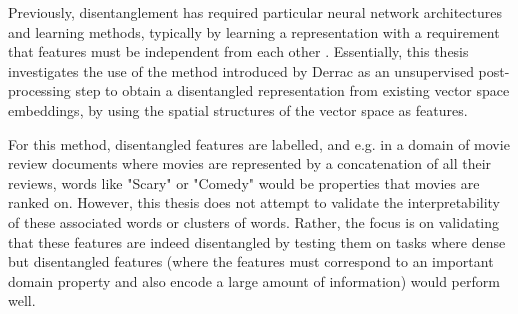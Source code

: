 Previously, disentanglement has required particular  neural network architectures and learning methods, typically by learning a representation with a requirement that features must be independent from each other \cite{Banner}  \cite{Paige2016}.  Essentially, this thesis investigates the use of the method introduced by Derrac \cite{Derrac2015} as an unsupervised post-processing step to obtain a disentangled representation from existing vector space embeddings, by using the spatial structures of the vector space as features.

For this method, disentangled features are labelled, and e.g. in a domain of movie review documents where movies are represented by a concatenation of all their reviews, words like "Scary" or "Comedy" would be properties that movies are ranked on. However, this thesis does not attempt to validate the interpretability of these associated words or clusters of words. Rather, the focus is on validating that these features are indeed disentangled by testing them on tasks where dense but disentangled features (where the features must correspond to an important domain property and also  encode a large amount of information) would perform well. 










